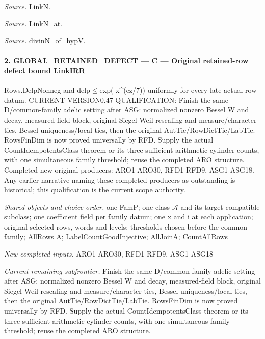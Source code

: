 \emph{Source.} \href{https://github.com/CocoSgt/riemann-hypothesis-lean/blob/7cbf7a0c32fca1badf05931879a37c3f8a2b03b4/src/Formalism/SharpRestriction/GlobalTheoremInputs.lean#L45-L48}{LinkN}.

\emph{Source.} \href{https://github.com/CocoSgt/riemann-hypothesis-lean/blob/7cbf7a0c32fca1badf05931879a37c3f8a2b03b4/src/Formalism/SharpRestriction/GlobalTheoremInputs.lean#L40-L44}{LinkN\_\allowbreak at}.

\emph{Source.} \href{https://github.com/CocoSgt/riemann-hypothesis-lean/blob/7cbf7a0c32fca1badf05931879a37c3f8a2b03b4/src/Development/AutomorphicArithmetic/CharacterBoxes/DivinNOfHypV.lean#L117-L134}{divinN\_\allowbreak of\_\allowbreak hypV}.



\paragraph{2. GLOBAL\_\allowbreak RETAINED\_\allowbreak DEFECT — C — Original retained-row defect bound LinkIRR}

Rows.DelpNonneg and delp$\le$exp(-x\textasciicircum{}(ez/7)) uniformly for every late actual row datum. CURRENT VERSION0.47 QUALIFICATION: Finish the same-D/common-family adelic setting after ASG: normalized nonzero Bessel W and decay, measured-field block, original Siegel-Weil rescaling and measure/character ties, Bessel uniqueness/local ties, then the original AutTie/RowDictTie/LabTie. RowsFinDim is now proved universally by RFD. Supply the actual CountIdempotentsClass theorem or its three sufficient arithmetic cylinder counts, with one simultaneous family threshold; reuse the completed ARO structure. Completed new original producers: ARO1-ARO30, RFD1-RFD9, ASG1-ASG18. Any earlier narrative naming these completed producers as outstanding is historical; this qualification is the current scope authority.

\emph{Shared objects and choice order.} one FamP; one class $\mathcal A$ and its target-compatible subclass; one coefficient field per family datum; one x and i at each application; original selected rows, words and levels; thresholds chosen before the common family; AllRows A; LabelCountGoodInjective; AllJoinA; CountAllRows

\emph{New completed inputs.} ARO1-ARO30, RFD1-RFD9, ASG1-ASG18

\emph{Current remaining subfrontier.} Finish the same-D/common-family adelic setting after ASG: normalized nonzero Bessel W and decay, measured-field block, original Siegel-Weil rescaling and measure/character ties, Bessel uniqueness/local ties, then the original AutTie/RowDictTie/LabTie. RowsFinDim is now proved universally by RFD. Supply the actual CountIdempotentsClass theorem or its three sufficient arithmetic cylinder counts, with one simultaneous family threshold; reuse the completed ARO structure.

